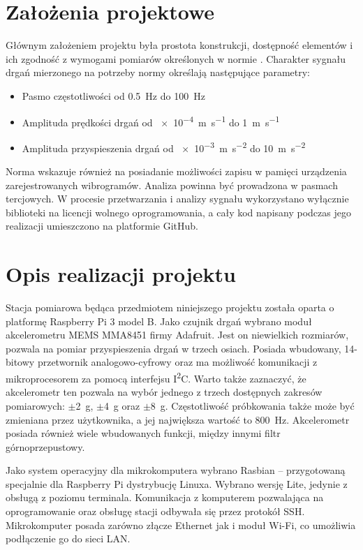 \documentclass[a4paper,12pt]{mwart}
\begin{document}
\section{Założenia projektowe}

Głównym założeniem projektu była prostota konstrukcji, dostępność elementów i
ich zgodność z wymogami pomiarów określonych w normie \cite{norma}. Charakter
sygnału drgań mierzonego na potrzeby normy określają następujące parametry:
\begin{itemize}
  \item Pasmo częstotliwości od \SI{0,5}{\hertz} do \SI{100}{\hertz}
  \item Amplituda prędkości drgań od \SI{e-4}{\metre\per\second} do \SI{1}{\metre\per\second}
  \item Amplituda przyspieszenia drgań od \SI{e-3}{\metre\per\square\second} do \SI{10}{\metre\per\square\second}
\end{itemize}
Norma wskazuje również na posiadanie możliwości zapisu w pamięci urządzenia
zarejestrowanych wibrogramów. Analiza powinna być prowadzona w pasmach
tercjowych. W procesie przetwarzania i analizy sygnału wykorzystano wyłącznie
biblioteki na licencji wolnego oprogramowania, a cały kod napisany podczas jego
realizacji umieszczono na platformie GitHub.

\section{Opis realizacji projektu}

Stacja pomiarowa będąca przedmiotem niniejszego projektu została oparta o
platformę Raspberry Pi 3 model B. Jako czujnik drgań wybrano moduł akcelerometru
MEMS MMA8451 firmy Adafruit. Jest on niewielkich rozmiarów, pozwala na pomiar
przyspieszenia drgań w trzech osiach. Posiada wbudowany, 14-bitowy przetwornik
analogowo-cyfrowy oraz ma możliwość komunikacji z mikroprocesorem za pomocą
interfejsu I\textsuperscript{2}C. Warto także zaznaczyć, że akcelerometr ten
pozwala na wybór jednego z trzech dostępnych zakresów pomiarowych:
$\pm$\SI{2}{\g}, $\pm$\SI{4}{\g} oraz $\pm$\SI{8}{\g}. Częstotliwość próbkowania
także może być zmieniana przez użytkownika, a jej największa wartość to
\SI{800}{\hertz}. Akcelerometr posiada również wiele wbudowanych funkcji, między
innymi filtr górnoprzepustowy.

Jako system operacyjny dla mikrokomputera wybrano Rasbian -- przygotowaną
specjalnie dla Raspberry Pi dystrybucję Linuxa. Wybrano wersję Lite, jedynie z
obsługą z poziomu terminala. Komunikacja z komputerem pozwalająca na
oprogramowanie oraz obsługę stacji odbywała się przez protokół SSH.
Mikrokomputer posada zarówno złącze Ethernet jak i moduł Wi-Fi, co umożliwia
podłączenie go do sieci LAN.
\end{document}
